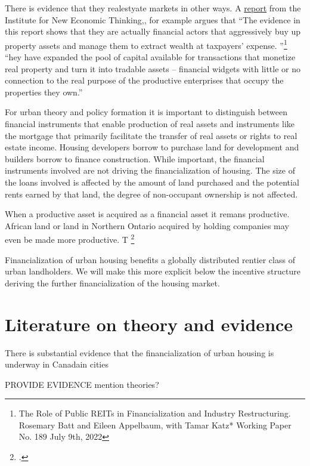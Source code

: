 There is evidence that they realestyate markets in other ways. A \href{https://www.ineteconomics.org/research/research-papers/the-role-of-public-reits-in-financialization-and-industry-restructuring}{report} from the Institute for New Economic Thinking,, for example argues that ``The evidence in this report shows that they are actually financial actors that aggressively buy up property assets and manage them to extract wealth at taxpayers’ expense. ''\footnote{The Role of Public REITs in Financialization and Industry Restructuring. Rosemary Batt and Eileen Appelbaum, with Tamar Katz* Working Paper No. 189 July 9th, 2022} ``hey have expanded the pool of capital available for transactions that monetize real property and turn it into tradable assets – financial widgets with little or no connection to the real purpose of the productive enterprises that occupy the properties they own.''



For urban theory and policy formation it is important to distinguish between financial instruments that enable production of real assets and instruments like the mortgage that primarily facilitate the transfer of real assets or rights to real estate  income. Housing developers borrow to purchase land for development and builders borrow to finance construction. While important, the financial instruments involved are not driving the financialization of housing.  The size of the loans involved is affected by the amount of land purchased and the potential rents earned by that land, the degree of non-occupant ownership is not affected.


When  a productive asset is acquired as a financial asset it remans productive. African land or land in Northern Ontario acquired by holding companies may even be made more productive. 
T%
\footnote{.} 

Financialization of urban housing benefits  a globally distributed rentier class of urban landholders. We will make this more explicit below the incentive structure deriving the further financialization of the housing market.

\section{Literature on theory and evidence}
{\color{red}There is substantial evidence that the financialization of urban housing is underway in Canadain cities

PROVIDE EVIDENCE 	mention theories?}


